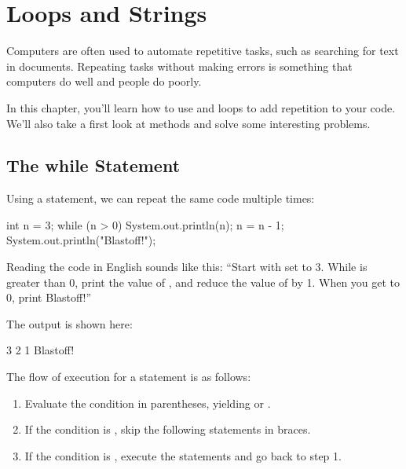 \chapter{Loops and Strings}

Computers are often used to automate repetitive tasks, such as searching for text in documents.
Repeating tasks without making errors is something that computers do well and people do poorly.

In this chapter, you'll learn how to use  and  loops to add repetition to your code.
We'll also take a first look at  methods and solve some interesting problems.



\section{The while Statement}


Using a  statement, we can repeat the same code multiple times:

\begin{code}
int n = 3;
while (n > 0) {
    System.out.println(n);
    n = n - 1;
}
System.out.println("Blastoff!");
\end{code}

Reading the code in English sounds like this: ``Start with  set to 3.
While  is greater than 0, print the value of , and reduce the value of  by 1.
When you get to 0, print Blastoff!''

The output is shown here:

\begin{stdout}
3
2
1
Blastoff!
\end{stdout}

The flow of execution for a  statement is as follows:

\begin{enumerate}

\item Evaluate the condition in parentheses, yielding  or .

\item If the condition is , skip the following statements in braces.

\item If the condition is , execute the statements and go back to step 1.

\end{enumerate}

